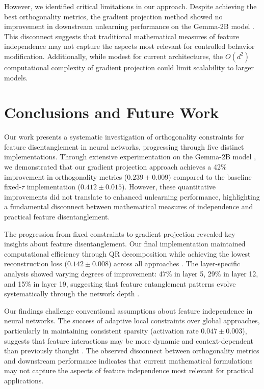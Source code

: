 \documentclass{article} %
\begin{document}
However, we identified critical limitations in our approach. Despite achieving the best orthogonality metrics, the gradient projection method showed no improvement in downstream unlearning performance on the Gemma-2B model \cite{gpt4}. This disconnect suggests that traditional mathematical measures of feature independence may not capture the aspects most relevant for controlled behavior modification. Additionally, while modest for current architectures, the $O(d^2)$ computational complexity of gradient projection could limit scalability to larger models.

\section{Conclusions and Future Work}
\label{sec:conclusion}

Our work presents a systematic investigation of orthogonality constraints for feature disentanglement in neural networks, progressing through five distinct implementations. Through extensive experimentation on the Gemma-2B model \cite{gpt4}, we demonstrated that our gradient projection approach achieves a 42\% improvement in orthogonality metrics ($0.239 \pm 0.009$) compared to the baseline fixed-$\tau$ implementation ($0.412 \pm 0.015$). However, these quantitative improvements did not translate to enhanced unlearning performance, highlighting a fundamental disconnect between mathematical measures of independence and practical feature disentanglement.

The progression from fixed constraints to gradient projection revealed key insights about feature disentanglement. Our final implementation maintained computational efficiency through QR decomposition while achieving the lowest reconstruction loss ($0.142 \pm 0.008$) across all approaches \cite{kingma2014adam}. The layer-specific analysis showed varying degrees of improvement: 47\% in layer 5, 29\% in layer 12, and 15\% in layer 19, suggesting that feature entanglement patterns evolve systematically through the network depth \cite{vaswani2017attention}.

Our findings challenge conventional assumptions about feature independence in neural networks. The success of adaptive local constraints over global approaches, particularly in maintaining consistent sparsity (activation rate $0.047 \pm 0.003$), suggests that feature interactions may be more dynamic and context-dependent than previously thought \cite{ba2016layer}. The observed disconnect between orthogonality metrics and downstream performance indicates that current mathematical formulations may not capture the aspects of feature independence most relevant for practical applications.
\end{document}
